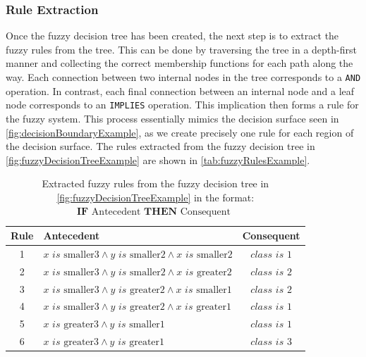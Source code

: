 \subsubsection{Rule Extraction}

Once the fuzzy decision tree has been created, the next step is to extract the fuzzy rules from the tree. This can be done by traversing the tree in a depth-first manner and collecting the correct membership functions for each path along the way. Each connection between two internal nodes in the tree corresponds to a \texttt{AND} operation. In contrast, each final connection between an internal node and a leaf node corresponds to an \texttt{IMPLIES} operation. This implication then forms a rule for the fuzzy system.
This process essentially mimics the decision surface seen in \autoref{fig:decisionBoundaryExample}, as we create precisely one rule for each region of the decision surface. The rules extracted from the fuzzy decision tree in \autoref{fig:fuzzyDecisionTreeExample} are shown in \autoref{tab:fuzzyRulesExample}.

\newcommand{\is}{\textit{ is }}


\begin{table}[H]
    \centering
    \begin{tabular}{c|l|c}
        \textbf{Rule} & \textbf{Antecedent}                                                             & \textbf{Consequent} \\
        \hline
        1             & $x \is \text{smaller3} \land y \is \text{smaller2} \land x \is \text{smaller2}$ & $class \is 1$       \\
        2             & $x \is \text{smaller3} \land y \is \text{smaller2} \land x \is \text{greater2}$ & $class \is 2$       \\
        3             & $x \is \text{smaller3} \land y \is \text{greater2} \land x \is \text{smaller1}$ & $class \is 2$       \\
        4             & $x \is \text{smaller3} \land y \is \text{greater2} \land x \is \text{greater1}$ & $class \is 1$       \\
        5             & $x \is \text{greater3} \land y \is \text{smaller1}$                             & $class \is 1$       \\
        6             & $x \is \text{greater3} \land y \is \text{greater1}$                             & $class \is 3$       \\
    \end{tabular}
    \caption[Extracted fuzzy rules from the fuzzy decision tree]{Extracted fuzzy rules from the fuzzy decision tree in \autoref{fig:fuzzyDecisionTreeExample} in the format: $\textbf{IF} \text{ Antecedent } \textbf{THEN} \text{ Consequent }$}
    \label{tab:fuzzyRulesExample}
\end{table}

